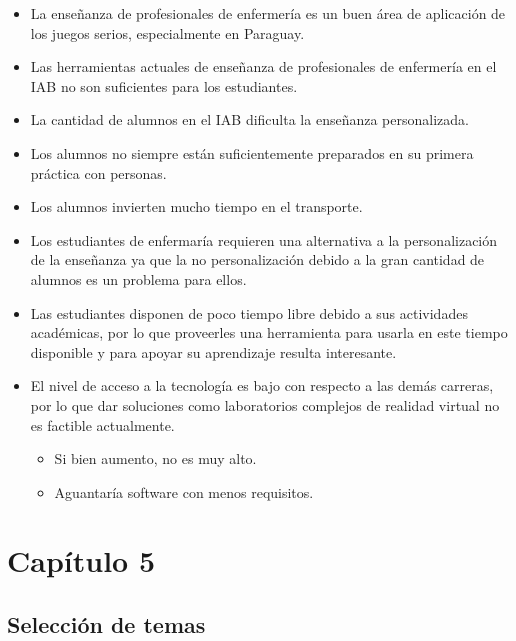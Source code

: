 \begin{itemize}
\item La enseñanza de profesionales de enfermería es un buen área de aplicación
    de los juegos serios, especialmente en Paraguay.
\item Las herramientas actuales de enseñanza de profesionales de enfermería en
    el IAB no son suficientes para los estudiantes\cite{iab:tesis_atencion}.
\item La cantidad de alumnos en el IAB dificulta la enseñanza
    personalizada\cite{iab:tesis_alumnos}.
\item Los alumnos no siempre están suficientemente preparados en su primera
    práctica con personas\cite{iab:tesis_alumnos}.
\item Los alumnos invierten mucho tiempo en el transporte\cite{iab:tesis_alumnos}.
\item Los estudiantes de enfermaría requieren una alternativa a la
    personalización de la enseñanza ya que la no personalización debido a la
    gran cantidad de alumnos es un problema para ellos.
\item Las estudiantes disponen de poco tiempo libre debido a sus actividades
    académicas, por lo que proveerles una herramienta para usarla en este tiempo
    disponible y para apoyar su aprendizaje resulta interesante.
\item El nivel de acceso a la tecnología es bajo con respecto a las demás
    carreras, por lo que dar soluciones como laboratorios complejos de realidad
    virtual no es factible actualmente.
    \begin{itemize}
        \item Si bien aumento, no es muy alto.
        \item Aguantaría software con menos requisitos.
    \end{itemize}

\end{itemize}

\section{Capítulo 5}

\subsection{Selección de temas}

